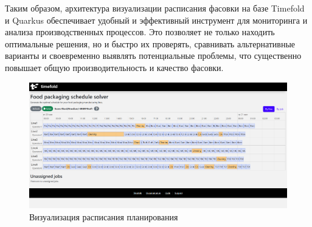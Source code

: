 Таким образом, архитектура визуализации расписания фасовки на базе Timefold и Quarkus обеспечивает удобный и эффективный инструмент для мониторинга и анализа производственных процессов. Это позволяет не только находить оптимальные решения, но и быстро их проверять, сравнивать альтернативные варианты и своевременно выявлять потенциальные проблемы, что существенно повышает общую производительность и качество фасовки.
 \begin{figure}[ht]
 \centering
		\includegraphics[height = 8 cm, keepaspectratio]{../assets/images/3_1_1Quarkus.png}
		\caption{Визуализация расписания планирования}
		\label{fig:quarkus_3_1}
\end{figure}

